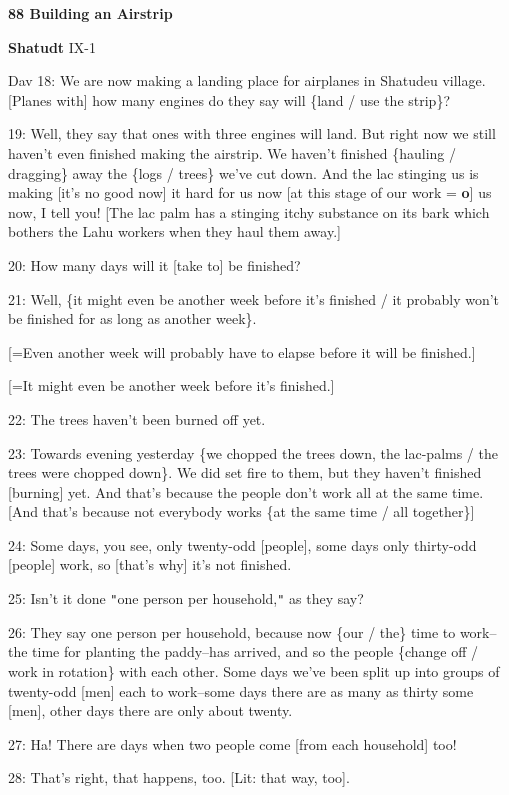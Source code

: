 
\textbf{88 Building an Airstrip }

\textbf{Shatudt} IX-1

Dav 18: We are now making a landing place for airplanes in Shatudeu village. [Planes
with] how many engines do they say will \{land / use the strip\}?

19: Well, they say that ones with three engines will land. But right now we still
haven't even finished making the airstrip. We haven't finished \{hauling / dragging\}
away the \{logs / trees\} we've cut down. And the lac stinging us is making [it's
no good now] it hard for us now [at this stage of our work = \textbf{o}] us now,
I tell you! [The lac palm has a stinging itchy substance on its bark which bothers
the Lahu workers when they haul them away.]

20: How many days will it [take to] be finished?

21: Well, \{it might even be another week before it's finished / it probably won't
be finished for as long as another week\}.

[=Even another week will probably have to elapse before it will be finished.]

[=It might even be another week before it's finished.]

22: The trees haven't been burned off yet.

23: Towards evening yesterday \{we chopped the trees down, the lac-palms / the
trees were chopped down\}.  We did set fire to them, but they haven't finished
[burning] yet. And that's because the people don't work all at the same time. [And
that's because not everybody works \{at the same time / all together\}]

24: Some days, you see, only twenty-odd [people], some days only thirty-odd [people]
work, so [that's why] it's not finished.

25: Isn't it done \texttt{"}one person per household,\texttt{"} as they say?

26: They say one person per household, because now \{our / the\} time to work--the
time for planting the paddy--has arrived, and so the people \{change off / work
in rotation\} with each other. Some days we've been split up into groups of twenty-odd
[men] each to work--some days there are as many as thirty some [men], other days
there are only about twenty.

27: Ha! There are days when two people come [from each household] too!

28: That's right, that happens, too. [Lit: that way, too].

